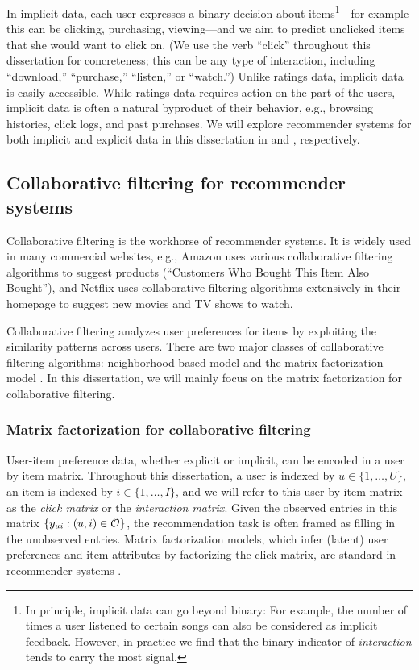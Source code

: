 In implicit data, each user expresses a binary decision about items\footnote{In principle, implicit data can go beyond binary: For example, the number of times a user listened to certain songs can also be considered as implicit feedback. However, in practice we find that the binary indicator of \textit{interaction} tends to carry the most signal. }---for
example this can be clicking, purchasing, viewing---and we aim to
predict unclicked items that she would want to click on. (We use the verb ``click'' throughout this dissertation for concreteness; this can be any type of interaction, including
``download,'' ``purchase,'' ``listen,'' or ``watch.'') Unlike
ratings data, implicit data is easily accessible.  While ratings data
requires action on the part of the users, implicit data is often a
natural byproduct of their behavior, e.g., browsing histories, click
logs, and past purchases. We will explore recommender systems for both implicit and explicit data in this dissertation in  and , respectively.

\subsection{Collaborative filtering for recommender systems} \label{chpt:background:sec:cf}

Collaborative filtering is the workhorse of recommender systems. It is widely used in many commercial websites, e.g., Amazon uses various collaborative filtering algorithms to suggest products (``Customers Who Bought This Item Also Bought''), and Netflix uses collaborative filtering algorithms extensively in their homepage to suggest new movies and TV shows to watch.

Collaborative filtering analyzes user preferences for items by exploiting the similarity patterns across users. There are two major classes of collaborative filtering algorithms: neighborhood-based model \citep{sarwar2001item} and the matrix factorization model \citep{koren2009matrix}. In this dissertation, we will mainly focus on the matrix factorization for collaborative filtering. 

\subsubsection{Matrix factorization for collaborative filtering} 
\label{chpt:background:sec:mf_cf}

User-item preference data, whether explicit or implicit, can be encoded in a user by item matrix. Throughout this dissertation, a user is indexed by $u \in \{1, \dots, U\}$, an item is indexed by $i \in \{1, \dots, I\}$, and we will refer to this user by item matrix as the \emph{click matrix} or the \emph{interaction matrix}. Given the observed entries in this matrix $\{y_{ui}: (u, i) \in \mathcal{O}\}$, the recommendation task is often framed as filling in the unobserved entries.  Matrix factorization models, which infer (latent) user preferences and item attributes by factorizing the click matrix, are standard in recommender systems \citep{koren2009matrix}. 

